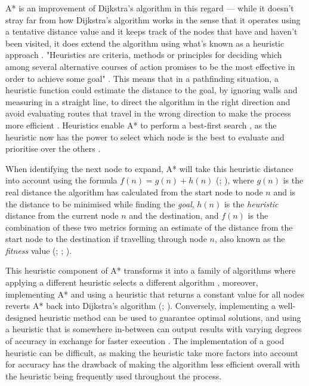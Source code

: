 \documentclass[11pt, a4paper]{report}
\begin{document}
A* is an improvement of Dijkstra's algorithm in this regard \parencite[101]{hart1968formal} --- while it doesn't stray far from how Dijkstra's algorithm works in the sense that it operates using a tentative distance value and it keeps track of the nodes that have and haven't been visited, it does extend the algorithm using what's known as a heuristic approach \parencite[126]{cui2011based}. "Heuristics are criteria, methods or principles for deciding which among several alternative courses of action promises to be the most effective in order to achieve some goal" \parencite[3]{pearl1984heuristics}. This means that in a pathfinding situation, a heuristic function could estimate the distance to the goal, by ignoring walls and measuring in a straight line, to direct the algorithm in the right direction and avoid evaluating routes that travel in the wrong direction to make the process more efficient \parencite[127]{cui2011based}. Heuristics enable A* to perform a best-first search \parencite[46]{yap2002grid}, as the heuristic now has the power to select which node is the best to evaluate and prioritise over the others \parencite[94]{russell2016artificial}.

When identifying the next node to expand, A* will take this heuristic distance into account using the formula $f(n) = g(n) + h(n)$ (\cite[102]{hart1968formal}; \cite[95]{russell2016artificial}), where $g(n)$ is the real distance the algorithm has calculated from the start node to node $n$ and is the distance to be minimised while finding the \emph{goal}, $h(n)$ is the \emph{heuristic} distance from the current node $n$ and the destination, and $f(n)$ is the combination of these two metrics forming an estimate of the distance from the start node to the destination if travelling through node $n$, also known as the \emph{fitness} value (\cite{hart1968formal}; \cite{millington2019ai}; \cite[64]{graham2003pathfinding}). 

This heuristic component of A* transforms it into a family of algorithms where applying a different heuristic selects a different algorithm \parencite[107]{hart1968formal}, moreover, implementing A* and using a heuristic that returns a constant value for all nodes reverts A* back into Dijkstra's algorithm (\cite[10]{lester2005pathfinding}; \cite[237]{millington2019ai}). Conversely, implementing a well-designed heuristic method can be used to guarantee optimal solutions, and using a heuristic that is somewhere in-between can output results with varying degrees of accuracy in exchange for faster execution \parencite[219]{millington2019ai}.  The implementation of a good heuristic can be difficult, as making the heuristic take more factors into account for accuracy has the drawback of making the algorithm less efficient overall with the heuristic being frequently used throughout the process.
\end{document}

